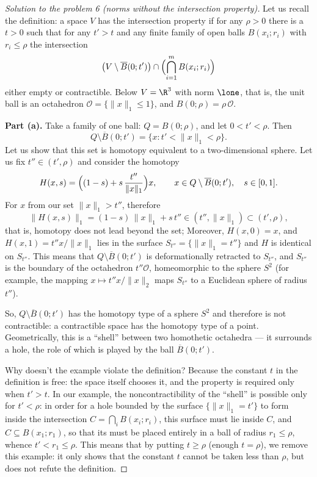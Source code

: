 \documentclass[a4paper,12pt]{report}
\begin{document}
\begin{proof}[Solution to the problem \textup{6} \textup{(}norms without the intersection property\textup{)}]

Let us recall the definition: a space $V$ has the intersection property if for any $\rho > 0$ there is a $t > 0$ such that for any $t' > t$ and any finite family of open balls $B(x_i; r_i)$ with $r_i \le \rho$ the intersection
\[
\bigl( V \setminus \overline B(0; t') \bigr) \cap \Bigl( \bigcap_{i=1}^m B(x_i; r_i) \Bigr)
\]
either empty or contractible. Below $V = \R^3$ with norm $\lone$, that is, the unit ball is an octahedron $\mathcal O = \bigl\{ \|x\|_1 \le 1 \bigr\}$, and $B(0; \rho) = \rho\, \mathcal O$.

\textbf{Part \textup{(a)}.} Take a family of one ball: $Q = B(0; \rho)$, and let $0 < t' < \rho$. Then
\[
Q \setminus \overline B(0; t') = \bigl\{ x : t' < \|x\|_1 < \rho \bigr\}.
\]
Let us show that this set is homotopy equivalent to a two-dimensional sphere. Let us fix $t'' \in (t', \rho)$ and consider the homotopy
\[
H(x, s) = \Bigl( (1-s) + s\, \frac{t''}{\|x\|_1} \Bigr) x, \qquad x \in Q \setminus \overline B(0; t'), \quad s \in [0, 1].
\]
For $x$ from our set $\|x\|_1 > t''$, therefore
\[
\bigl\| H(x, s) \bigr\|_1 = (1-s)\, \|x\|_1 + s\, t'' \in (t'', \|x\|_1) \subset (t', \rho),
\]
that is, homotopy does not lead beyond the set; Moreover, $H(x, 0) = x$, and $H(x, 1) = t'' x / \|x\|_1$ lies in the surface $S_{t''} = \bigl\{ \|x\|_1 = t'' \bigr\}$ and $H$ is identical on $S_{t''}$. This means that $Q \setminus \overline B(0; t')$ is deformationally retracted to $S_{t''}$, and $S_{t''}$ is the boundary of the octahedron $t'' \mathcal O$, homeomorphic to the sphere $S^2$ \textup{(}for example, the mapping $x \mapsto t'' x / \|x\|_2$ maps $S_{t''}$ to a Euclidean sphere of radius $t''$\textup{)}.

So, $Q \setminus \overline B(0; t')$ has the homotopy type of a sphere $S^2$ and therefore is not contractible: a contractible space has the homotopy type of a point. Geometrically, this is a ``shell'' between two homothetic octahedra --- it surrounds a hole, the role of which is played by the ball $\overline B(0; t')$.

Why doesn't the example violate the definition? Because the constant $t$ in the definition is free: the space itself chooses it, and the property is required only when $t' > t$. In our example, the noncontractibility of the ``shell'' is possible only for $t' < \rho$: in order for a hole bounded by the surface $\bigl\{ \|x\|_1 = t' \bigr\}$ to form inside the intersection $C = \bigcap_i B(x_i; r_i)$, this surface must lie inside $C$, and $C \subseteq B(x_1; r_1)$, so that its must be placed entirely in a ball of radius $r_1 \le \rho$, whence $t' < r_1 \le \rho$. This means that by putting $t \ge \rho$ \textup{(}enough $t = \rho$\textup{)}, we remove this example: it only shows that the constant $t$ cannot be taken less than $\rho$, but does not refute the definition.


\end{proof}
\end{document}
